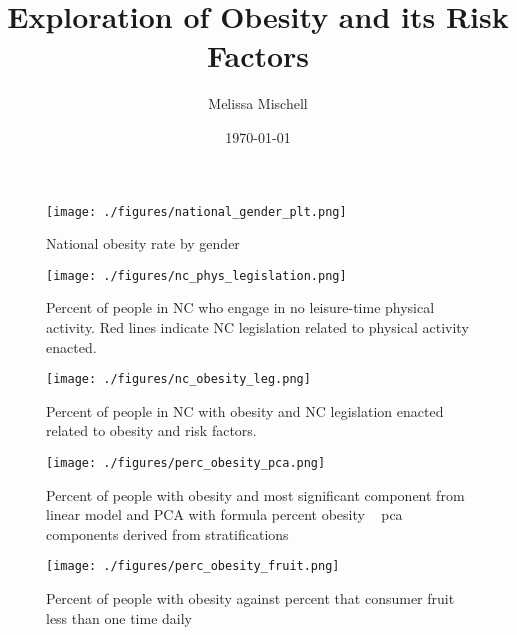 \documentclass[11pt]{article}
\title{Exploration of Obesity and its Risk Factors}
\author{Melissa Mischell}
\date{\today}
\begin{document}
\maketitle

\begin{figure}[h]
\texttt{[image: ./figures/national\_gender\_plt.png]}
\caption{National obesity rate by gender}
\label{fig:gender}
\end{figure}

\begin{figure}[h]
\texttt{[image: ./figures/nc\_phys\_legislation.png]}
\caption{
  Percent of people in NC who engage in no leisure-time physical activity. 
  Red lines indicate NC legislation related to physical activity enacted.
}
\label{fig:phys_act}
\end{figure}

\begin{figure}[h]
\texttt{[image: ./figures/nc\_obesity\_leg.png]}
\caption{
  Percent of people in NC with obesity and NC legislation enacted related to obesity and risk factors. 
}
\label{fig:nc_obesity}
\end{figure}

\begin{figure}[h]
\texttt{[image: ./figures/perc\_obesity\_pca.png]}
\caption{
  Percent of people with obesity and most significant component from linear model and PCA with formula percent obesity ~ pca components derived from stratifications   
}
\label{fig:nc_obesity}
\end{figure}

\begin{figure}[h]
\texttt{[image: ./figures/perc\_obesity\_fruit.png]}
\caption{
  Percent of people with obesity against percent that consumer fruit less than one time daily
}
\label{fig:obesity_fruit}
\end{figure}
\end{document}
